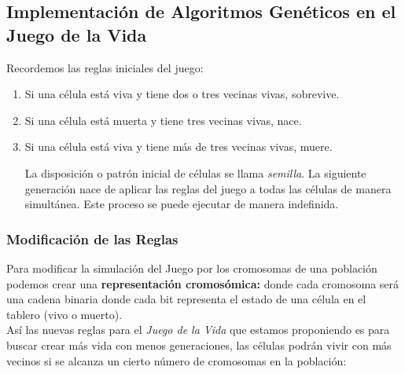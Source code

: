\subsection{Implementación de Algoritmos Genéticos en el Juego de la Vida}

Recordemos las reglas iniciales del juego:
\begin{enumerate}
    \item Si una célula está viva y tiene dos o tres vecinas vivas, sobrevive.
    \item Si una célula está muerta y tiene tres vecinas vivas, nace.
    \item Si una célula está viva y tiene más de tres vecinas vivas, muere.
    
    La disposición o patrón inicial de células se llama \textit{semilla}. La siguiente 
    generación nace de aplicar las reglas del juego a todas las células de manera 
    simultánea. Este proceso se puede ejecutar de manera indefinida.
\end{enumerate}

\subsubsection*{Modificación de las Reglas}

Para modificar la simulación del Juego por los cromosomas de una población podemos crear
una \textbf{representación cromosómica:} donde cada cromosoma será una cadena binaria 
donde cada bit representa el estado de una célula en el tablero (vivo o muerto).\\ 

Así las nuevas reglas para el \textit{Juego de la Vida} que estamos proponiendo es para 
buscar crear más vida con menos generaciones, las células  podrán vivir con más vecinos 
si se alcanza un cierto número de cromosomas en la población:

